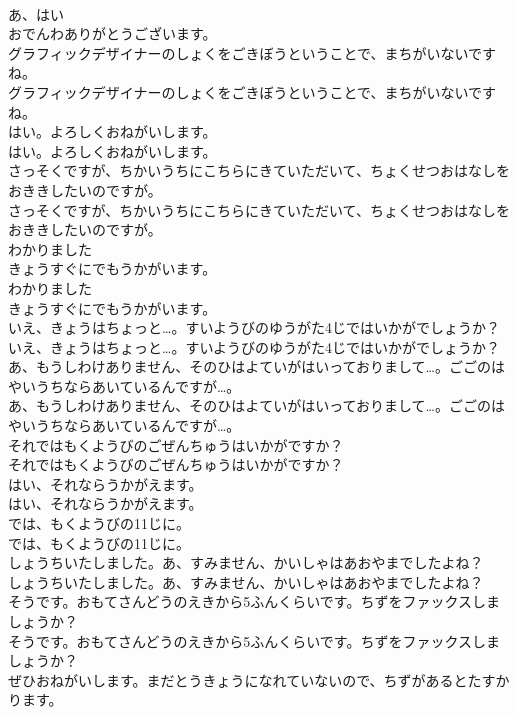 \documentclass[8pt]{extreport}
\begin{document}
\begin{CJK}{UTF8}{min}
\\	あ、はい
\\	おでんわありがとうございます。
\\	グラフィックデザイナーのしょくをごきぼうということで、まちがいないですね。
\\	グラフィックデザイナーのしょくをごきぼうということで、まちがいないですね。
\\	はい。よろしくおねがいします。
\\	はい。よろしくおねがいします。
\\	さっそくですが、ちかいうちにこちらにきていただいて、ちょくせつおはなしをおききしたいのですが。
\\	さっそくですが、ちかいうちにこちらにきていただいて、ちょくせつおはなしをおききしたいのですが。
\\	わかりました
\\	きょうすぐにでもうかがいます。
\\	わかりました
\\	きょうすぐにでもうかがいます。
\\	いえ、きょうはちょっと…。すいようびのゆうがた4じではいかがでしょうか？
\\	いえ、きょうはちょっと…。すいようびのゆうがた4じではいかがでしょうか？
\\	あ、もうしわけありません、そのひはよていがはいっておりまして…。ごごのはやいうちならあいているんですが…。
\\	あ、もうしわけありません、そのひはよていがはいっておりまして…。ごごのはやいうちならあいているんですが…。
\\	それではもくようびのごぜんちゅうはいかがですか？
\\	それではもくようびのごぜんちゅうはいかがですか？
\\	はい、それならうかがえます。
\\	はい、それならうかがえます。
\\	では、もくようびの11じに。
\\	では、もくようびの11じに。
\\	しょうちいたしました。あ、すみません、かいしゃはあおやまでしたよね？
\\	しょうちいたしました。あ、すみません、かいしゃはあおやまでしたよね？
\\	そうです。おもてさんどうのえきから5ふんくらいです。ちずをファックスしましょうか？
\\	そうです。おもてさんどうのえきから5ふんくらいです。ちずをファックスしましょうか？
\\	ぜひおねがいします。まだとうきょうになれていないので、ちずがあるとたすかります。

\end{CJK}
\end{document}
